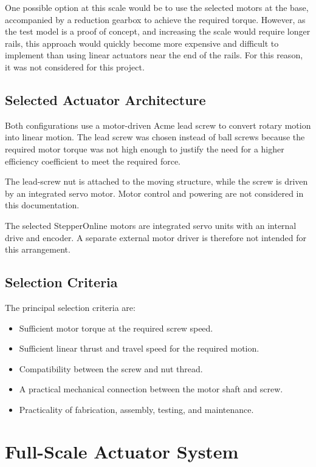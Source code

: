 \documentclass[11pt]{article}
\begin{document}
One possible option at this scale would be to use the selected motors at the
base, accompanied by a reduction gearbox to achieve the required torque.
However, as the test model is a proof of concept, and increasing the scale
would require longer rails, this approach would quickly become more expensive
and difficult to implement than using linear actuators near the end of the
rails. For this reason, it was not considered for this project.

\subsection{Selected Actuator Architecture}

Both configurations use a motor-driven Acme lead screw to convert rotary
motion into linear motion. The lead screw was chosen instead of ball screws
because the required motor torque was not high enough to justify the need
for a higher efficiency coefficient to meet the required force.

The lead-screw nut is attached to the moving structure, while the screw is
driven by an integrated servo motor. Motor control and powering are not
considered in this documentation.

The selected StepperOnline motors are integrated servo units with an internal
drive and encoder. A separate external motor driver is therefore not intended
for this arrangement.

\subsection{Selection Criteria}

The principal selection criteria are:
\begin{itemize}[leftmargin=1.5em]
    \item Sufficient motor torque at the required screw speed.
    \item Sufficient linear thrust and travel speed for the required motion.
    \item Compatibility between the screw and nut thread.
    \item A practical mechanical connection between the motor shaft and screw.
    \item Practicality of fabrication, assembly, testing, and maintenance.
\end{itemize}

\section{Full-Scale Actuator System}
\end{document}
